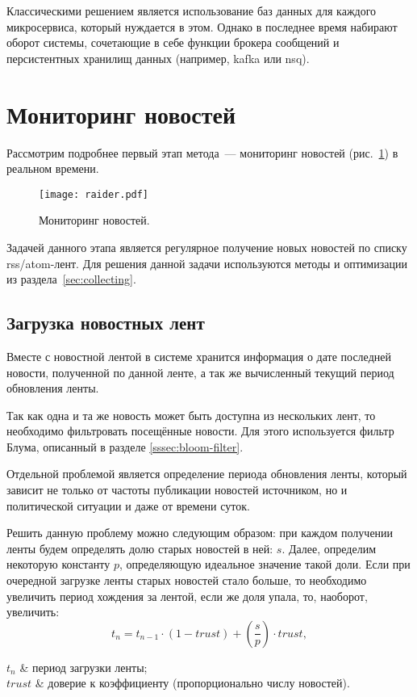 Классическими решением является использование баз данных для каждого микросервиса, который нуждается в этом. Однако в последнее время набирают оборот системы, сочетающие в себе функции брокера сообщений и персистентных хранилищ данных (например, kafka или nsq).

\section{Мониторинг новостей}
Рассмотрим подробнее первый этап метода~--- мониторинг новостей (рис.~\ref{fig:raider}) в реальном времени.

\begin{figure}[h]
    \centering
    \texttt{[image: raider.pdf]}
    \caption{Мониторинг новостей.}
    \label{fig:raider}
\end{figure}

Задачей данного этапа является регулярное получение новых новостей по списку rss/atom-лент. Для решения данной задачи используются методы и оптимизации из раздела~\ref{sec:collecting}.

\subsection{Загрузка новостных лент}
Вместе с новостной лентой в системе хранится информация о дате последней новости, полученной по данной ленте, а так же вычисленный текущий период обновления ленты.

Так как одна и та же новость может быть доступна из нескольких лент, то необходимо фильтровать посещённые новости. Для этого используется фильтр Блума, описанный в разделе \ref{sssec:bloom-filter}.

Отдельной проблемой является определение периода обновления ленты, который зависит не только от частоты публикации новостей источником, но и политической ситуации и даже от времени суток.

Решить данную проблему можно следующим образом: при каждом получении ленты будем определять долю старых новостей в ней: $s$. Далее, определим некоторую константу $p$, определяющую идеальное значение такой доли. Если при очередной загрузке ленты старых новостей стало больше, то необходимо увеличить период хождения за лентой, если же доля упала, то, наоборот, увеличить:
\begin{equation}
    t_n=t_{n-1}\cdot(1-trust)+\left(\frac{s}{p}\right)\cdot trust,
\end{equation}
\begin{conditions}
    $t_n$ & период загрузки ленты; \\
    $trust$ & доверие к коэффициенту (пропорционально числу новостей). \\
\end{conditions}

